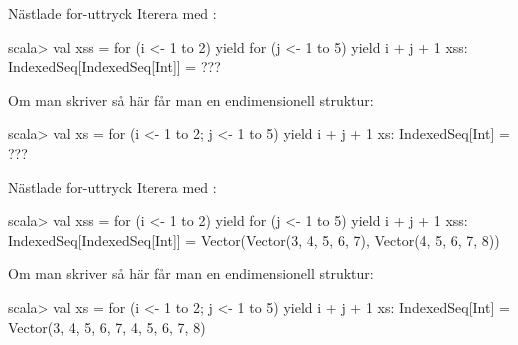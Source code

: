 







\begin{Slide}{Nästlade for-uttryck}\SlideFontSmall
Iterera med :\\

\begin{REPL}
scala> val xss = for (i <- 1 to 2) yield {
                   for (j <- 1 to 5) yield i + j + 1
                 }
xss: IndexedSeq[IndexedSeq[Int]] =
      ???

\end{REPL}
\pause Om man skriver så här får man en endimensionell struktur:
\begin{REPL}
scala> val xs = for (i <- 1 to 2; j <- 1 to 5) yield i + j + 1
xs: IndexedSeq[Int] =
    ???

\end{REPL}
\end{Slide}

\begin{Slide}{Nästlade for-uttryck}\SlideFontSmall
Iterera med :\\
\begin{REPL}
scala> val xss = for (i <- 1 to 2) yield {
                   for (j <- 1 to 5) yield i + j + 1
                 }
xss: IndexedSeq[IndexedSeq[Int]] =
    Vector(Vector(3, 4, 5, 6, 7), Vector(4, 5, 6, 7, 8))

\end{REPL}
\pause Om man skriver så här får man en endimensionell struktur:
\begin{REPL}
scala> val xs = for (i <- 1 to 2; j <- 1 to 5) yield i + j + 1
xs: IndexedSeq[Int] =
    Vector(3, 4, 5, 6, 7, 4, 5, 6, 7, 8)

\end{REPL}
\end{Slide}



